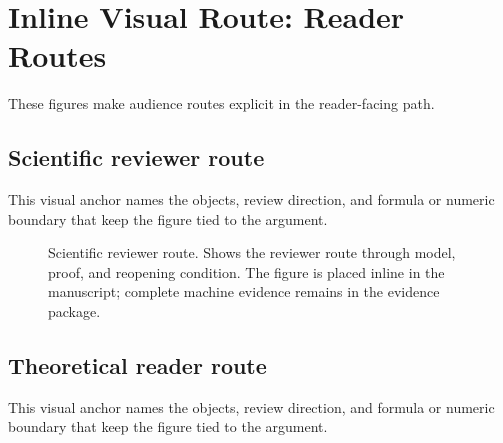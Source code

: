 \section{Inline Visual Route: Reader Routes}

These figures make audience routes explicit in the reader-facing path.


\subsection{Scientific reviewer route}

This visual anchor names the objects, review direction, and formula or numeric boundary that keep the figure tied to the argument.


\begin{figure}[htbp]

\centering


\caption{Scientific reviewer route. Shows the reviewer route through model, proof, and reopening condition. The figure is placed inline in the manuscript; complete machine evidence remains in the evidence package.}

\label{fig:r005-inline-28e_oc133_inline_figures_reader_routes-1}

\end{figure}

\subsection{Theoretical reader route}

This visual anchor names the objects, review direction, and formula or numeric boundary that keep the figure tied to the argument.


